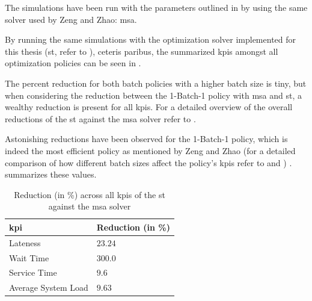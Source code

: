 \documentclass{seal_thesis}
\begin{document}

The simulations have been run with the parameters outlined in  by using the same solver used by Zeng and Zhao: \gls{msa}.

By running the same simulations with the optimization solver implemented for this thesis (\ie \gls{st}, refer to ), ceteris paribus, the summarized \glspl{kpi} amongst all optimization policies can be seen in .


The percent reduction for both batch policies with a higher batch size is tiny, but when considering the reduction between the 1-Batch-1 policy with \gls{msa} and \gls{st}, a wealthy reduction is present for all \glspl{kpi}. For a detailed overview of the overall reductions of the \gls{st} against the \gls{msa} solver refer to .


Astonishing reductions have been observed for the 1-Batch-1 policy, which is indeed the most efficient policy as mentioned by Zeng and Zhao (for a detailed comparison of how different batch sizes affect the policy's \glspl{kpi} refer to  and ) \cite[p. 24]{Zeng2005}.  summarizes these values.

\begin{table}[!ht]
\centering
\begin{tabular}{@{}ll@{}}
\toprule
\gls{kpi}                 & Reduction (in \%) \\ \midrule
Lateness            & $23.24$             \\
Wait Time           & $300.0$             \\
Service Time        & $9.6$             \\
Average System Load & $9.63$             \\ \bottomrule
\end{tabular}
\caption{Reduction (in \%) across all \glspl{kpi} of the \gls{st} against the \gls{msa} solver}
\label{tab:opt_kpis_comp_gain}
\end{table}
\end{document}
